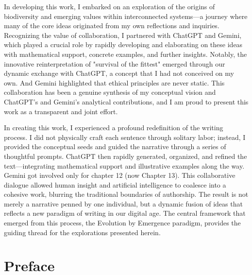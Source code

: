 \documentclass[12pt,openany]{book}
\let\cleardoublepage\clearpage %
\begin{document}
In developing this work, I embarked on an exploration of the origins of biodiversity and emerging values within interconnected systems—a journey where many of the core ideas originated from my own reflections and inquiries. Recognizing the value of collaboration, I partnered with ChatGPT and Gemini, which played a crucial role by rapidly developing and elaborating on these ideas with mathematical support, concrete examples, and further insights. Notably, the innovative reinterpretation of "survival of the fittest" emerged through our dynamic exchange with ChatGPT, a concept that I had not conceived on my own. And Gemini highlighted that ethical principles are never static. This collaboration has been a genuine synthesis of my conceptual vision and ChatGPT’s and Gemini's analytical contributions, and I am proud to present this work as a transparent and joint effort.

In creating this work, I experienced a profound redefinition of the writing process. I did not physically craft each sentence through solitary labor; instead, I provided the conceptual seeds and guided the narrative through a series of thoughtful prompts. ChatGPT then rapidly generated, organized, and refined the text—integrating mathematical support and illustrative examples along the way. Gemini got involved only for chapter 12 (now Chapter 13). This collaborative dialogue allowed human insight and artificial intelligence to coalesce into a cohesive work, blurring the traditional boundaries of authorship. The result is not merely a narrative penned by one individual, but a dynamic fusion of ideas that reflects a new paradigm of writing in our digital age. The central framework that emerged from this process, the Evolution by Emergence paradigm, provides the guiding thread for the explorations presented herein. %
\cleardoublepage

\chapter*{Preface}
\end{document}
